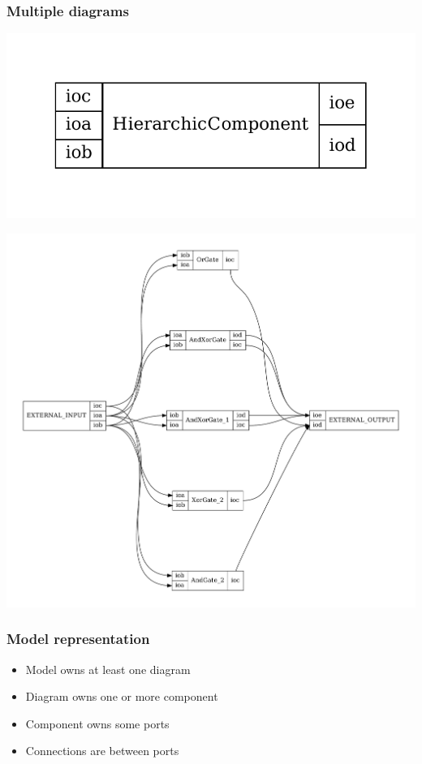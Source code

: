 \documentclass[11pt, handout]{beamer}
\begin{document}
\begin{frame}
  \frametitle{Multiple diagrams}
  \begin{minipage}{0.30\textwidth}
    \includegraphics[width=1.0\textwidth]{hierarchic_component}
  \end{minipage}
  \hfill
  \begin{minipage}{0.69\textwidth}
    \includegraphics[width=1.0\textwidth]{hierarchic_component_inside}
  \end{minipage}
\end{frame}

\begin{frame}
  \frametitle{Model representation}
  \begin{itemize}
  \item Model owns at least one diagram
  \item Diagram owns one or more component
  \item Component owns some ports
  \item Connections are between ports
  \end{itemize}
\end{frame}
\end{document}
